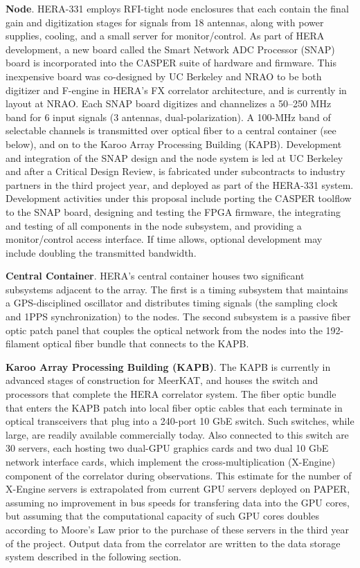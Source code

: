 \documentclass[preprint]{aastex}
\begin{document}
{\bf Node}. HERA-331 employs RFI-tight node enclosures that each contain the final gain and digitization stages for
signals from 18 antennas, along with power supplies, cooling, and a small server for monitor/control.  
As part of HERA development,
a new board called the Smart Network ADC Processor (SNAP) board is incorporated 
into the CASPER suite of hardware and firmware. This inexpensive board was co-designed by UC Berkeley and NRAO to be
both digitizer and F-engine in HERA's FX correlator architecture,
and is currently in layout at NRAO.  Each SNAP board 
digitizes and channelizes a 50--250 MHz band for 6 input signals (3 antennas, dual-polarization).
A 100-MHz band of selectable channels is transmitted over optical fiber
to a central container (see below), and on to the Karoo Array Processing Building (KAPB).  Development and integration of the SNAP
design and the node system is led at UC Berkeley and after a Critical Design Review, is fabricated
under subcontracts to industry partners in the third project year, and deployed as part of the HERA-331 system.
Development activities under this proposal include porting the CASPER toolflow to
the SNAP board, designing and testing the FPGA firmware,
the integrating and testing of all components in the node subsystem, and providing a monitor/control
access interface.  If time allows, optional development may include doubling the transmitted bandwidth.

{\bf Central Container}.
HERA's central container houses two significant subsystems adjacent to the array.  The first is a timing subsystem
that maintains a GPS-disciplined oscillator and distributes timing
signals (the sampling clock and 1PPS synchronization) to the nodes.  The second
subsystem is a passive fiber optic patch panel that couples
the optical network from the nodes into the 192-filament optical fiber bundle 
that connects to the KAPB. 

{\bf Karoo Array Processing Building (KAPB)}.
The KAPB is currently
in advanced stages of construction for MeerKAT, and houses the switch and processors
that 
complete the HERA correlator system.  The fiber optic bundle that enters the KAPB patch
into local fiber optic cables 
that each terminate in optical transceivers that plug into a 240-port 10 GbE switch.
Such switches, while large, are readily available commercially today.  Also connected to
this switch are 30 servers, each hosting two dual-GPU graphics cards and two dual
10 GbE network interface cards, which implement the cross-multiplication (X-Engine) component
of the correlator during observations.  This estimate for the number of X-Engine servers
is extrapolated from current GPU servers deployed on PAPER, assuming no improvement in bus
speeds for transfering data into the GPU cores, but assuming that the computational
capacity of such GPU cores doubles according to Moore's Law prior to the purchase of
these servers in the third year of the project.
Output data from the correlator are written to the data storage system described
in the following section.
\end{document}
